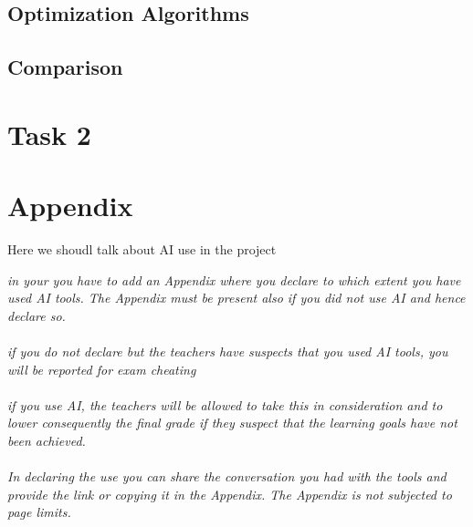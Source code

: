 \documentclass[a4paper,11pt]{article}
\begin{document}
\subsection{Optimization Algorithms}


\subsection{Comparison}



\newpage
\section{Task 2}



\newpage
\appendix
\section{Appendix}
Here we shoudl talk about AI use in the project

\textit{in your you have to add an Appendix where you declare to which extent you have used AI tools. 
        The Appendix must be present also if you did not use AI and hence declare so.
        }
\\\\
\textit{if you do not declare but the teachers have suspects that you used AI tools, 
        you will be reported for exam cheating
        }
\\\\
\textit{if you use AI, the teachers will be allowed to take this in consideration and to lower 
        consequently the final grade if they suspect that the learning goals have not been achieved.
        }
\\\\
\textit{In declaring the use you can share the conversation you had with the tools and provide the link or copying it in the Appendix. 
        The Appendix is not subjected to page limits.}
\end{document}
